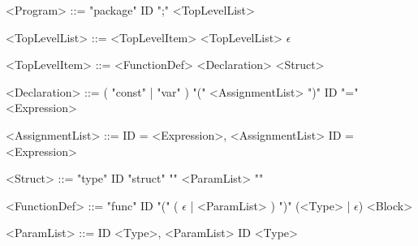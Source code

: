 \documentclass{article}
\begin{document}
    \begin{grammar}


    <Program>           ::=     "package" ID ";" <TopLevelList>




    <TopLevelList>      ::=     <TopLevelItem> <TopLevelList> 
                        \alt    $\epsilon$

    <TopLevelItem>      ::=     <FunctionDef> 
                        \alt    <Declaration> 
                        \alt    <Struct>


    <Declaration>       ::=     ( "const" | "var" ) "(" <AssignmentList> ")"
                        \alt    ID "=" <Expression>

    <AssignmentList>    ::=     ID = <Expression>, <AssignmentList> 
                        \alt    ID = <Expression>

    <Struct>            ::=     "type" ID "struct" "{" <ParamList> "}"


    <FunctionDef>       ::=     "func" ID "(" ( $\epsilon$ | <ParamList> ) ")" (<Type> | $\epsilon$) <Block>

    <ParamList>         ::=     ID <Type>, <ParamList> 
                        \alt    ID <Type>


\end{grammar}
\end{document}
